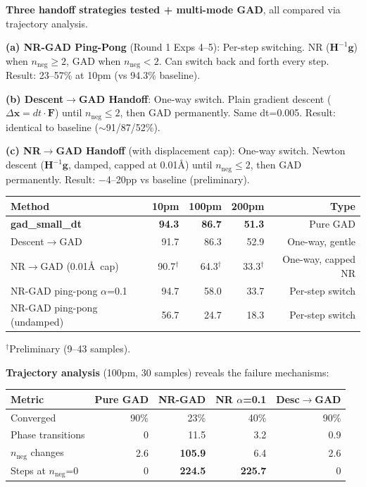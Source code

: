 \documentclass[11pt]{article}
\begin{document}
\textbf{Three handoff strategies tested + multi-mode GAD}, all compared via trajectory analysis.

\vspace{0.5em}
\textbf{(a) NR-GAD Ping-Pong} (Round 1 Exps 4--5): Per-step switching.
NR ($\mathbf{H}^{-1}\mathbf{g}$) when $n_{\text{neg}} \geq 2$, GAD when $n_{\text{neg}} < 2$.
Can switch back and forth every step. Result: 23--57\% at 10pm (vs 94.3\% baseline).

\textbf{(b) Descent$\to$GAD Handoff}: One-way switch.
Plain gradient descent ($\Delta\mathbf{x} = dt \cdot \mathbf{F}$) until $n_{\text{neg}} \leq 2$,
then GAD permanently. Same dt=0.005. Result: identical to baseline ($\sim$91/87/52\%).

\textbf{(c) NR$\to$GAD Handoff} (with displacement cap): One-way switch.
Newton descent ($\mathbf{H}^{-1}\mathbf{g}$, damped, capped at 0.01\AA) until $n_{\text{neg}} \leq 2$,
then GAD permanently. Result: $-$4--20pp vs baseline (preliminary).

\vspace{0.3em}
\begin{tabular}{l*{4}{r}}
\toprule
Method & 10pm & 100pm & 200pm & Type \\
\midrule
\textbf{gad\_small\_dt} & \textbf{94.3} & \textbf{86.7} & \textbf{51.3} & Pure GAD \\
Descent$\to$GAD & 91.7 & 86.3 & 52.9 & One-way, gentle \\
NR$\to$GAD (0.01\AA\ cap) & 90.7$^\dagger$ & 64.3$^\dagger$ & 33.3$^\dagger$ & One-way, capped NR \\
NR-GAD ping-pong $\alpha$=0.1 & 94.7 & 58.0 & 33.7 & Per-step switch \\
NR-GAD ping-pong (undamped) & 56.7 & 24.7 & 18.3 & Per-step switch \\
\bottomrule
\end{tabular}

{\small $^\dagger$Preliminary (9--43 samples).}

\textbf{Trajectory analysis} (100pm, 30 samples) reveals the failure mechanisms:

\vspace{0.3em}
\begin{tabular}{l*{4}{r}}
\toprule
Metric & Pure GAD & NR-GAD & NR $\alpha$=0.1 & Desc$\to$GAD \\
\midrule
Converged & 90\% & 23\% & 40\% & 90\% \\
Phase transitions & 0 & 11.5 & 3.2 & 0.9 \\
$n_{\text{neg}}$ changes & 2.6 & \textbf{105.9} & 6.4 & 2.6 \\
Steps at $n_{\text{neg}}$=0 & 0 & \textbf{224.5} & \textbf{225.7} & 0 \\
\bottomrule
\end{tabular}
\end{document}
